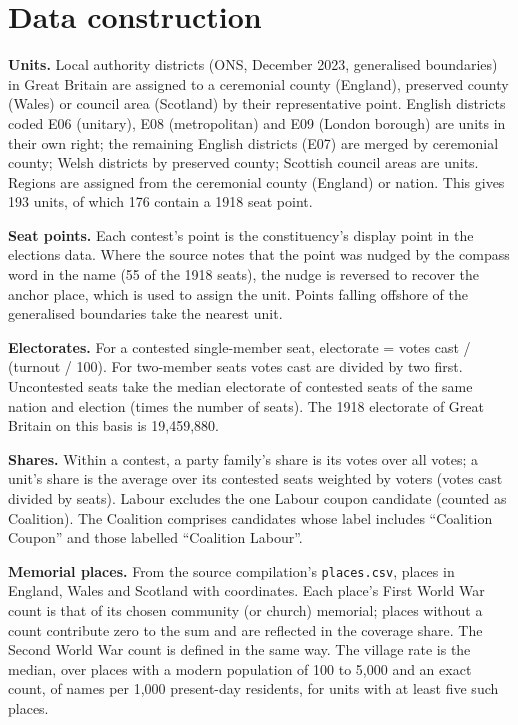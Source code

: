 \documentclass[11pt,a4paper]{article}
\begin{document}
\appendix
\section{Data construction}\label{app:data}
\textbf{Units.} Local authority districts (ONS, December 2023, generalised boundaries) in Great Britain are assigned to a ceremonial county (England), preserved county (Wales) or council area (Scotland) by their representative point. English districts coded E06 (unitary), E08 (metropolitan) and E09 (London borough) are units in their own right; the remaining English districts (E07) are merged by ceremonial county; Welsh districts by preserved county; Scottish council areas are units. Regions are assigned from the ceremonial county (England) or nation. This gives 193 units, of which 176 contain a 1918 seat point.

\textbf{Seat points.} Each contest's point is the constituency's display point in the elections data. Where the source notes that the point was nudged by the compass word in the name (55 of the 1918 seats), the nudge is reversed to recover the anchor place, which is used to assign the unit. Points falling offshore of the generalised boundaries take the nearest unit.

\textbf{Electorates.} For a contested single-member seat, electorate = votes cast / (turnout / 100). For two-member seats votes cast are divided by two first. Uncontested seats take the median electorate of contested seats of the same nation and election (times the number of seats). The 1918 electorate of Great Britain on this basis is 19,459,880.

\textbf{Shares.} Within a contest, a party family's share is its votes over all votes; a unit's share is the average over its contested seats weighted by voters (votes cast divided by seats). Labour excludes the one Labour coupon candidate (counted as Coalition). The Coalition comprises candidates whose label includes ``Coalition Coupon'' and those labelled ``Coalition Labour''.

\textbf{Memorial places.} From the source compilation's \texttt{places.csv}, places in England, Wales and Scotland with coordinates. Each place's First World War count is that of its chosen community (or church) memorial; places without a count contribute zero to the sum and are reflected in the coverage share. The Second World War count is defined in the same way. The village rate is the median, over places with a modern population of 100 to 5,000 and an exact count, of names per 1,000 present-day residents, for units with at least five such places.
\end{document}
